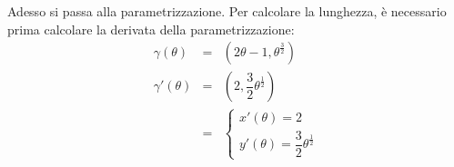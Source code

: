 \documentclass[a4paper]{article}
\begin{document}
	\noindent
	Adesso si passa alla parametrizzazione. Per calcolare la lunghezza, è necessario prima calcolare la derivata della parametrizzazione:
	\begin{equation*}
		\begin{array}{rcl}
			\gamma\left(\theta\right) &=& \left(2\theta - 1, \theta^{\frac{3}{2}}\right) \\ [1em]
			\gamma'\left(\theta\right) &=& \left(2, \dfrac{3}{2}\theta^{\frac{1}{2}}\right) \\ [1em]
			&=& \begin{cases}
				x'\left(\theta\right) = 2 \\
				y'\left(\theta\right) = \dfrac{3}{2}\theta^{\frac{1}{2}}
			\end{cases}
		\end{array}
	\end{equation*}\newpage
\end{document}
